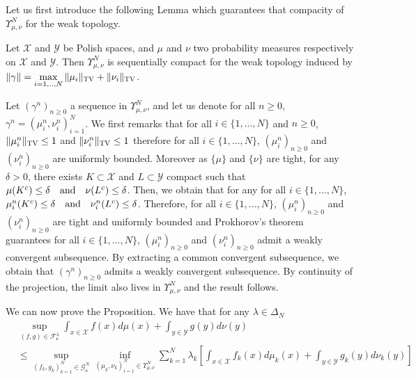 \begin{prv*}
\label{prv:dual-reformulation}
Let us first introduce the following Lemma which guarantees that compacity of  $\Upsilon^N_{\mu,\nu}$ for the weak topology.
\begin{lemma}
\label{lemma:weak-topo-dual-dual}
Let $\mathcal{X}$ and $\mathcal{Y}$ be Polish spaces, and $\mu$ and $\nu$ two probability measures respectively on  $\mathcal{X}$ and $\mathcal{Y}$. Then $\Upsilon^N_{\mu,\nu}$  is sequentially compact for the weak topology induced by $\Vert \gamma \Vert = \max\limits_{i=1,..,N} \Vert \mu_i\Vert_{\textsc{TV}} + \Vert \nu_i\Vert_{\textsc{TV}} $. 
\end{lemma}


\begin{prv*}
Let $(\gamma^n)_{n\geq 0}$ a sequence in $\Upsilon^N_{\mu,\nu}$, and let us denote for all $n\geq 0$, $\gamma^n=(\mu^n_i,\nu^n_i)_{i=1}^N$. We first remarks that for all $i\in\{1,...,N\}$ and $n\geq 0$, $\Vert \mu_i^n\Vert_{\textsc{TV}} \leq 1$ and $\Vert \nu_i^n\Vert_{\textsc{TV}} \leq 1$ therefore for all $i\in\{1,...,N\}$, $(\mu^n_i)_{n\geq 0}$ and $(\nu^n_i)_{n\geq 0}$  are uniformly bounded. Moreover as $\{\mu\}$ and $\{\nu\}$ are tight, for any $\delta>0$, there exists $K\subset \mathcal{X} $ and $L\subset \mathcal{Y}$ compact such that $\mu(K^c)\leq \delta \text{\quad and\quad }  \nu(L^c)\leq \delta$. Then, we obtain that for any for all $i\in\{1,...,N\}$, $\mu_i^n(K^c)\leq \delta \text{\quad and\quad }  \nu_i^n(L^c)\leq \delta$.
Therefore, for all $i\in\{1,...,N\}$,  $(\mu_i^n)_{n\geq 0}$ and $(\nu_i^n)_{n\geq 0}$ are tight and uniformly bounded and Prokhorov's theorem~\citep[Theorem A.3.15]{dupuis2011weak} guarantees for all $i\in\{1,...,N\}$,  $(\mu_i^n)_{n\geq 0}$ and $(\nu_i^n)_{n\geq 0}$ admit a weakly convergent subsequence. By extracting a common convergent subsequence, we obtain that $(\gamma^n)_{n\geq 0}$ admits a weakly convergent subsequence. By continuity of the projection, the limit also lives in $\Upsilon
^N_{\mu,\nu}$ and the result follows.
\end{prv*}
We can now prove the Proposition. We have that for any $\lambda\in\Delta_N$
\begin{align*}
      &\sup\limits_{(f,g)\in\mathcal{F}_{\mathbf{c}}^{\lambda}} \int_{x\in\mathcal{X}} f(x)d\mu(x)+ \int_{y\in\mathcal{Y}} g(y)d\nu(y)\\
  &\leq \sup\limits_{(f_k,g_k)_{k=1}^N\in  \mathcal{G}^{N}_{\mathbf{c}}} \inf_{(\mu_k,\nu_k)_{i=1}^N\in\Upsilon_{\mu,\nu}^N } \sum_{k=1}^N \lambda_k \left[\int_{x\in\mathcal{X}} f_k(x)d\mu_k(x)+ \int_{y\in\mathcal{Y}} g_k(y)d\nu_k(y)\right]\\

\end{align*}
\end{prv*}

